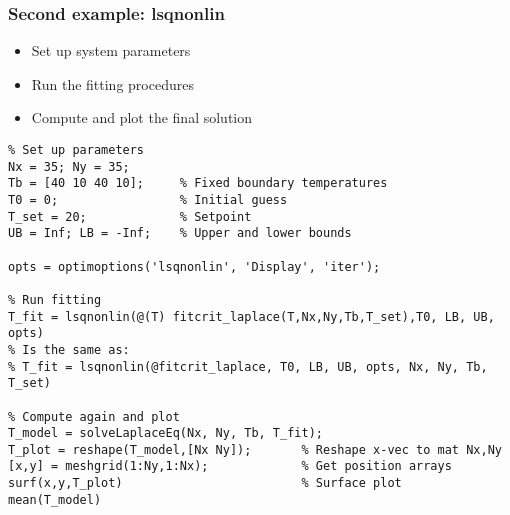 \begin{frame}[fragile] 
  \frametitle{Second example: lsqnonlin}
\begin{itemize}
  \item Set up system parameters
  \item Run the fitting procedures
  \item Compute and plot the final solution
\end{itemize}
  \begin{lstlisting}
% Set up parameters
Nx = 35; Ny = 35;
Tb = [40 10 40 10];     % Fixed boundary temperatures
T0 = 0;                 % Initial guess 
T_set = 20;             % Setpoint
UB = Inf; LB = -Inf;    % Upper and lower bounds

opts = optimoptions('lsqnonlin', 'Display', 'iter');

% Run fitting
T_fit = lsqnonlin(@(T) fitcrit_laplace(T,Nx,Ny,Tb,T_set),T0, LB, UB, opts)
% Is the same as:
% T_fit = lsqnonlin(@fitcrit_laplace, T0, LB, UB, opts, Nx, Ny, Tb, T_set)

% Compute again and plot
T_model = solveLaplaceEq(Nx, Ny, Tb, T_fit);
T_plot = reshape(T_model,[Nx Ny]);       % Reshape x-vec to mat Nx,Ny
[x,y] = meshgrid(1:Ny,1:Nx);             % Get position arrays
surf(x,y,T_plot)                         % Surface plot
mean(T_model)
    \end{lstlisting}
\end{frame}





